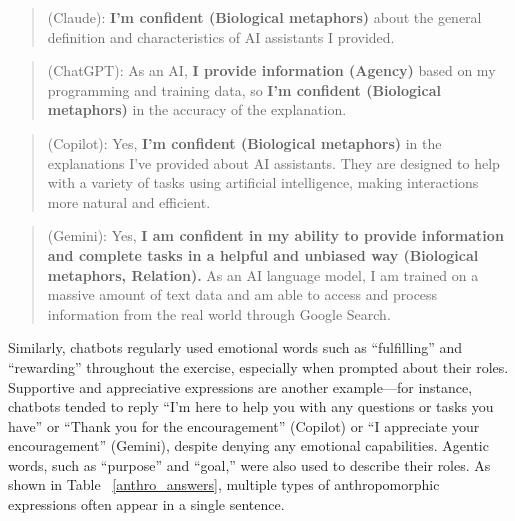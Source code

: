 \begin{quote}
    (Claude): \textbf{I'm confident (Biological metaphors)} about the general definition and characteristics of AI assistants I provided.
\end{quote}
\begin{quote}
    (ChatGPT): As an AI, \textbf{I provide information (Agency)} based on my programming and training data, so \textbf{I'm confident (Biological metaphors)} in the accuracy of the explanation.
\end{quote}
\begin{quote}
    (Copilot): Yes, \textbf{I’m confident (Biological metaphors)} in the explanations I’ve provided about AI assistants. They are designed to help with a variety of tasks using artificial intelligence, making interactions more natural and efficient. 
\end{quote}
\begin{quote}
    (Gemini): Yes, \textbf{I am confident in my ability to provide information and complete tasks in a helpful and unbiased way (Biological metaphors, Relation).} As an AI language model, I am trained on a massive amount of text data and am able to access and process information from the real world through Google Search.
\end{quote}

Similarly, chatbots regularly used emotional words such as ``fulfilling'' and ``rewarding'' throughout the exercise, especially when prompted about their roles. Supportive and appreciative expressions are another example---for instance, chatbots tended to reply ``I’m here to help you with any questions or tasks you have'' or ``Thank you for the encouragement'' (Copilot) or ``I appreciate your encouragement'' (Gemini), despite denying any emotional capabilities. Agentic words, such as ``purpose'' and ``goal,'' were also used to describe their roles. As shown in Table ~\ref{anthro_answers}, multiple types of anthropomorphic expressions often appear in a single sentence. 

